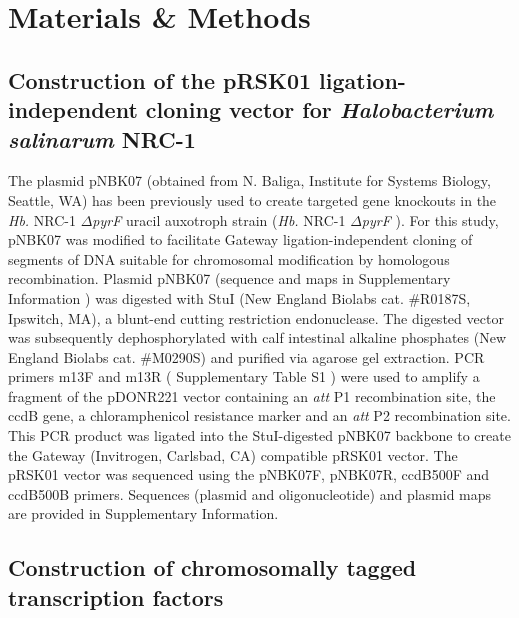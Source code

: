 \section{Materials \& Methods}

\subsection{Construction of the pRSK01 ligation-independent cloning vector for {\em Halobacterium salinarum} NRC-1}

The plasmid pNBK07 (obtained from N. Baliga, Institute for Systems Biology, Seattle, WA) has been previously used to create targeted gene knockouts \cite{kaur_coordination_2010, facciotti2010large, schmid2007anatomy, kaur_systems_2006} in the {\em Hb.} NRC-1 $\Delta${\em pyrF}  uracil auxotroph strain ({\em Hb.} NRC-1 $\Delta${\em pyrF} ). For this study, pNBK07 was modified to facilitate Gateway ligation-independent cloning of segments of DNA suitable for chromosomal modification by homologous recombination. Plasmid pNBK07 (sequence and maps in Supplementary Information ) was digested with StuI (New England Biolabs cat. \#R0187S, Ipswitch, MA), a blunt-end cutting restriction endonuclease. The digested vector was subsequently dephosphorylated with calf intestinal alkaline phosphates (New England Biolabs cat. \#M0290S) and purified via agarose gel extraction. PCR primers m13F and m13R ( Supplementary Table S1 ) were used to amplify a fragment of the pDONR221 vector containing an {\em att} P1 recombination site, the ccdB gene, a chloramphenicol resistance marker and an {\em att} P2 recombination site. This PCR product was ligated into the StuI-digested pNBK07 backbone to create the Gateway (Invitrogen, Carlsbad, CA) compatible pRSK01 vector. The pRSK01 vector was sequenced using the pNBK07F, pNBK07R, ccdB500F and ccdB500B primers. Sequences (plasmid and oligonucleotide) and plasmid maps are provided in Supplementary Information.

\subsection{Construction of chromosomally tagged transcription factors}

